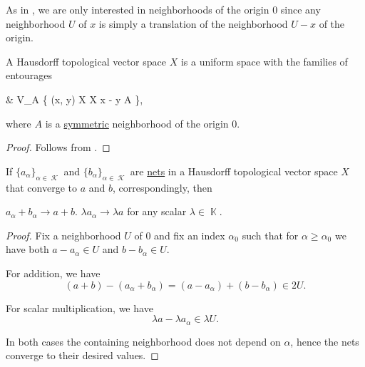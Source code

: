 \begin{remark}\label{rem:origin_neighborhoods_in_topological_vector_spaces}
  As in , we are only interested in neighborhoods of the origin \( 0 \) since any neighborhood \( U \) of \( x \) is simply a translation of the neighborhood \( U - x \) of the origin.
\end{remark}

\begin{proposition}\label{thm:topological_vector_space_is_uniform}
  A Hausdorff topological vector space \( X \) is a uniform space with the families of entourages
  \begin{balign*}
     & V_A \coloneqq \{ (x, y) \in X \times X \colon x - y \in A \},
  \end{balign*}
  where \( A \) is a \hyperref[def:neighborhood_set_types/symmetric]{symmetric} neighborhood of the origin \( 0 \).
\end{proposition}
\begin{proof}
  Follows from .
\end{proof}

\begin{proposition}\label{thm:linearity_of_sequence_limits}
  If \( \{ a_\alpha \}_{\alpha \in \mscrK} \) and \( \{ b_\alpha \}_{\alpha \in \mscrK} \) are \hyperref[def:topological_net]{nets} in a Hausdorff topological vector space \( X \) that converge to \( a \) and \( b \), correspondingly, then
  \begin{thmenum}
     \( a_\alpha + b_\alpha \to a + b \).
     \( \lambda a_\alpha \to \lambda a \) for any scalar \( \lambda \in \BbbK \).
  \end{thmenum}
\end{proposition}
\begin{proof}
  Fix a neighborhood \( U \) of \( 0 \) and fix an index \( \alpha_0 \) such that for \( \alpha \geq \alpha_0 \) we have both \( a - a_\alpha \in U \) and \( b - b_\alpha \in U \).

   For addition, we have
  \begin{equation*}
    (a + b) - (a_\alpha + b_\alpha) = (a - a_\alpha) + (b - b_\alpha) \in 2U.
  \end{equation*}

   For scalar multiplication, we have
  \begin{equation*}
    \lambda a - \lambda a_\alpha \in \lambda U.
  \end{equation*}

  In both cases the containing neighborhood does not depend on \( \alpha \), hence the nets converge to their desired values.
\end{proof}

